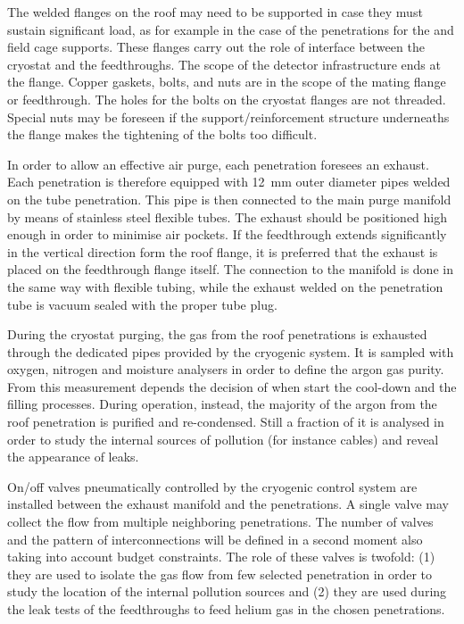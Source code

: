 The welded flanges on the roof may need to be supported in case they must sustain significant load, as for example in the case of the penetrations for the  and field cage supports.
These flanges carry out the role of interface between the cryostat and the feedthroughs.
The scope of the detector infrastructure ends at the flange.
Copper gaskets, bolts, and nuts are in the scope of the mating flange or feedthrough.
The holes for the bolts on the cryostat flanges are not threaded.
Special nuts may be foreseen if the support/reinforcement structure underneaths the flange makes the tightening of the bolts too difficult.

In order to allow an effective air purge, each penetration foresees an exhaust. Each penetration is therefore equipped with 12~mm outer diameter pipes welded on the tube penetration.
This pipe is then connected to the main purge manifold by means of stainless steel flexible tubes.
The exhaust should be positioned high enough in order to minimise air pockets.
If the feedthrough extends significantly in the vertical direction form the roof flange, it is preferred that the exhaust is placed on the feedthrough flange itself.
The connection to the manifold is done in the same way with flexible tubing, while the exhaust welded on the penetration tube is vacuum sealed with the proper tube plug.

During the cryostat purging, the gas from the roof penetrations is exhausted through the dedicated pipes provided by the cryogenic system.
It is sampled with oxygen, nitrogen and moisture analysers in order to define the argon gas purity.
From this measurement depends the decision of when start the cool-down and the filling processes.
During operation, instead, the majority of the argon from the roof penetration is purified and re-condensed.
Still a fraction of it is analysed in order to study the internal sources of pollution (for instance cables) and reveal the appearance of leaks.

On/off valves pneumatically controlled by the cryogenic control system are installed between the exhaust manifold and the penetrations.
A single valve may collect the flow from multiple neighboring penetrations.
The number of valves and the pattern of interconnections will be defined in a second moment also taking into account budget constraints.
The role of these valves is twofold: (1) they are used to isolate the gas flow from few selected penetration in order to study the location of the internal pollution sources and (2) they are used during the leak tests of the feedthroughs to feed helium gas in the chosen penetrations.

